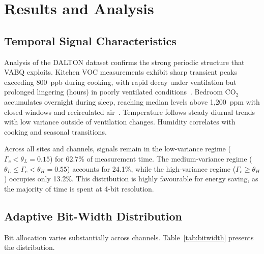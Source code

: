 \section{Results and Analysis}
\label{sec:results}

\subsection{Temporal Signal Characteristics}
\label{sec:res_temporal}

Analysis of the DALTON dataset confirms the strong periodic structure that VABQ exploits. Kitchen VOC measurements exhibit sharp transient peaks exceeding 800~ppb during cooking, with rapid decay under ventilation but prolonged lingering (hours) in poorly ventilated conditions~\cite{karmakar2024exploring}. Bedroom CO$_2$ accumulates overnight during sleep, reaching median levels above 1,200~ppm with closed windows and recirculated air~\cite{karmakar2024indoor}. Temperature follows steady diurnal trends with low variance outside of ventilation changes. Humidity correlates with cooking and seasonal transitions.

Across all sites and channels, signals remain in the low-variance regime ($\Gamma_c < \theta_L = 0.15$) for 62.7\% of measurement time. The medium-variance regime ($\theta_L \leq \Gamma_c < \theta_H = 0.55$) accounts for 24.1\%, while the high-variance regime ($\Gamma_c \geq \theta_H$) occupies only 13.2\%. This distribution is highly favourable for energy saving, as the majority of time is spent at 4-bit resolution.

\subsection{Adaptive Bit-Width Distribution}
\label{sec:res_bitwidth}

Bit allocation varies substantially across channels. Table~\ref{tab:bitwidth} presents the distribution.

